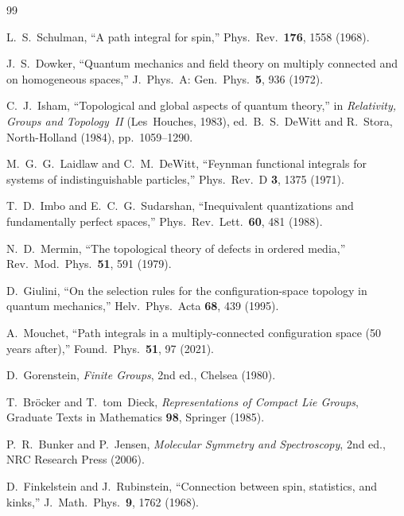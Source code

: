 \documentclass[12pt]{article}
\theoremstyle{definition}
\theoremstyle{remark}
\begin{document}
\begin{thebibliography}{99}

  L.~S.~Schulman,
  ``A path integral for spin,''
  Phys.\ Rev.\ \textbf{176}, 1558 (1968).

  J.~S.~Dowker,
  ``Quantum mechanics and field theory on multiply connected
  and on homogeneous spaces,''
  J.\ Phys.\ A: Gen.\ Phys.\ \textbf{5}, 936 (1972).

  C.~J.~Isham,
  ``Topological and global aspects of quantum theory,''
  in \emph{Relativity, Groups and Topology~II}
  (Les~Houches, 1983),
  ed.\ B.~S.~DeWitt and R.~Stora,
  North-Holland (1984), pp.~1059--1290.

  M.~G.~G.~Laidlaw and C.~M.~DeWitt,
  ``Feynman functional integrals for systems of
  indistinguishable particles,''
  Phys.\ Rev.\ D \textbf{3}, 1375 (1971).

  T.~D.~Imbo and E.~C.~G.~Sudarshan,
  ``Inequivalent quantizations and fundamentally
  perfect spaces,''
  Phys.\ Rev.\ Lett.\ \textbf{60}, 481 (1988).

  N.~D.~Mermin,
  ``The topological theory of defects in ordered media,''
  Rev.\ Mod.\ Phys.\ \textbf{51}, 591 (1979).

  D.~Giulini,
  ``On the selection rules for the configuration-space
  topology in quantum mechanics,''
  Helv.\ Phys.\ Acta \textbf{68}, 439 (1995).

  A.~Mouchet,
  ``Path integrals in a multiply-connected configuration
  space (50 years after),''
  Found.\ Phys.\ \textbf{51}, 97 (2021).

  D.~Gorenstein,
  \emph{Finite Groups},
  2nd ed., Chelsea (1980).

  T.~Br\"ocker and T.~tom~Dieck,
  \emph{Representations of Compact Lie Groups},
  Graduate Texts in Mathematics \textbf{98},
  Springer (1985).

  P.~R.~Bunker and P.~Jensen,
  \emph{Molecular Symmetry and Spectroscopy},
  2nd ed., NRC Research Press (2006).

  D.~Finkelstein and J.~Rubinstein,
  ``Connection between spin, statistics, and kinks,''
  J.\ Math.\ Phys.\ \textbf{9}, 1762 (1968).


\end{thebibliography}
\end{document}
